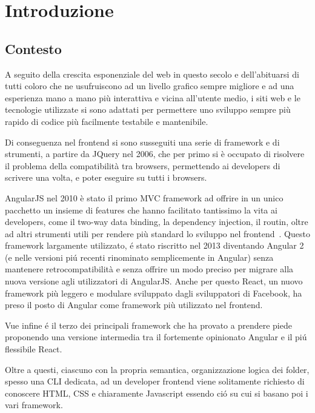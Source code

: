 \chapter{Introduzione}\label{cap:introduzione}

\section{Contesto}\label{sez:contesto}

A seguito della crescita esponenziale del web in questo secolo e dell'abituarsi di tutti coloro che ne usufruiscono ad un livello grafico sempre migliore e ad una esperienza mano a mano pi\`u interattiva e vicina all'utente medio, i siti web e le tecnologie utilizzate si sono adattati per permettere uno sviluppo sempre pi\`u rapido di codice pi\`u facilmente testabile e mantenibile.

Di conseguenza nel frontend si sono susseguiti una serie di framework e di strumenti, a partire da JQuery\cite{jquery} nel 2006, che per primo si \`e occupato di risolvere il problema della compatibilit\`a tra browsers, permettendo ai developers di scrivere una volta, e poter eseguire su tutti i browsers.

AngularJS nel 2010 \`e stato il primo MVC framework ad offrire in un unico pacchetto un insieme di features che hanno facilitato tantissimo la vita ai developers, come il two-way data binding, la dependency injection, il routin, oltre ad altri strumenti utili per rendere pi\`u standard lo sviluppo nel frontend~\cite{Hoff}.
Questo framework largamente utilizzato, \'e stato riscritto nel 2013 diventando Angular 2 (e nelle versioni pi\'u recenti rinominato semplicemente in Angular) senza mantenere retrocompatibilit\`a e senza offrire un modo preciso per migrare alla nuova versione agli utilizzatori di AngularJS.
Anche per questo React, un nuovo framework pi\`u leggero e modulare sviluppato dagli sviluppatori di Facebook, ha preso il posto di Angular come framework pi\`u utilizzato nel frontend.

Vue infine \'e il terzo dei principali framework che ha provato a prendere piede proponendo una versione intermedia tra il fortemente opinionato Angular e il pi\'u flessibile React.

Oltre a questi, ciascuno con la propria semantica, organizzazione logica dei folder, spesso una CLI dedicata, ad un developer frontend viene solitamente richiesto di conoscere HTML, CSS e chiaramente Javascript essendo ci\'o su cui si basano poi i vari framework.

